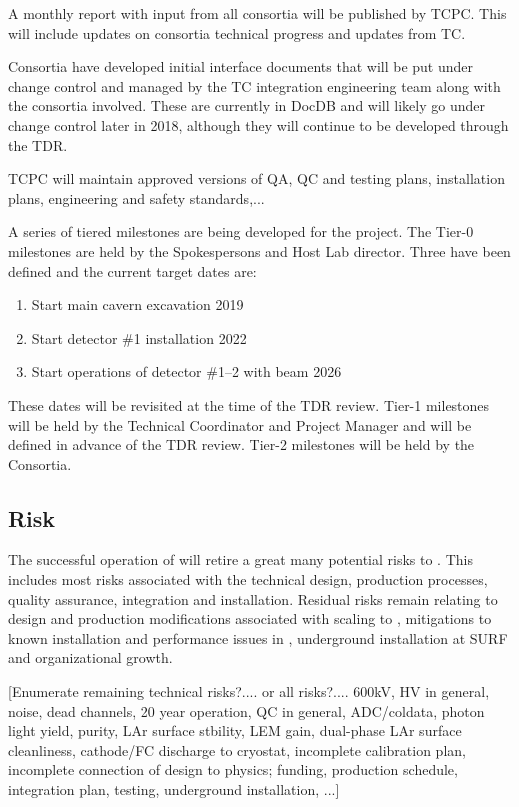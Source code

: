 A monthly report with input from all consortia will be published by
TCPC. This will include updates on consortia technical progress and
updates from TC.

Consortia have developed initial interface documents that will be put
under change control and managed by the TC integration engineering
team along with the consortia involved. These are currently in DocDB
and will likely go under change control later in 2018, although they
will continue to be developed through the TDR.

TCPC will maintain approved versions of QA, QC and testing plans,
installation plans, engineering and safety standards,...

A series of tiered milestones are being developed for the 
project. The Tier-0 milestones are held by the Spokespersons and Host
Lab director. Three have been defined and the current target dates
are:
\begin{enumerate}
\item Start main cavern excavation \hspace{2.1in} 2019
\item Start detector \#1 installation \hspace{2.1in} 2022
\item Start operations of detector \#1--2 with beam \hspace{1in} 2026
\end{enumerate}
These dates will be revisited at the time of the TDR review.  Tier-1
milestones will be held by the Technical Coordinator and  Project
Manager and will be defined in advance of the TDR review. Tier-2
milestones will be held by the Consortia.


\subsection{Risk}
\label{sec:fdsp-coord-risk}

The successful operation of  will retire a great many
potential risks to . This includes most risks associated with the
technical design, production processes, quality assurance, integration
and installation. Residual risks remain relating to design and
production modifications associated with scaling to , mitigations
to known installation and performance issues in , underground
installation at SURF and organizational growth.

[Enumerate remaining technical risks?.... or all risks?.... 600kV, HV
  in general, noise, dead channels, 20 year operation, QC in general,
  ADC/coldata, photon light yield, purity, LAr surface stbility, LEM
  gain, dual-phase LAr surface cleanliness, cathode/FC discharge to
  cryostat, incomplete calibration plan, incomplete connection of
  design to physics; funding, production schedule, integration plan,
  testing, underground installation, ...]

